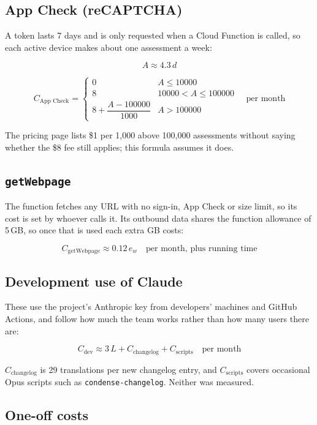 \documentclass[11pt]{article}
\begin{document}
\subsection{App Check (reCAPTCHA)}

A token lasts 7 days and is only requested when a Cloud Function is called,
so each active device makes about one assessment a week:

\[
A \approx 4.3\,d
\]

\[
C_{\text{App Check}} =
\begin{cases}
0 & A \le 10000 \\
8 & 10000 < A \le 100000 \\
8 + \dfrac{A - 100000}{1000} & A > 100000
\end{cases}
\quad \text{per month}
\]

The pricing page lists \$1 per 1{,}000 above 100{,}000 assessments without
saying whether the \$8 fee still applies; this formula assumes it does.

\subsection{\texttt{getWebpage}}

The function fetches any URL with no sign-in, App Check or size limit, so its
cost is set by whoever calls it. Its outbound data shares the function
allowance of 5\,GB, so once that is used each extra GB costs:

\[
C_{\text{getWebpage}} \approx 0.12\,e_w
\quad \text{per month, plus running time}
\]

\subsection{Development use of Claude}

These use the project's Anthropic key from developers' machines and GitHub
Actions, and follow how much the team works rather than how many users there
are:

\[
C_{\text{dev}} \approx 3\,L + C_{\text{changelog}} + C_{\text{scripts}}
\quad \text{per month}
\]

$C_{\text{changelog}}$ is 29 translations per new changelog entry, and
$C_{\text{scripts}}$ covers occasional Opus scripts such as
\texttt{condense-changelog}. Neither was measured.

\subsection{One-off costs}
\end{document}
